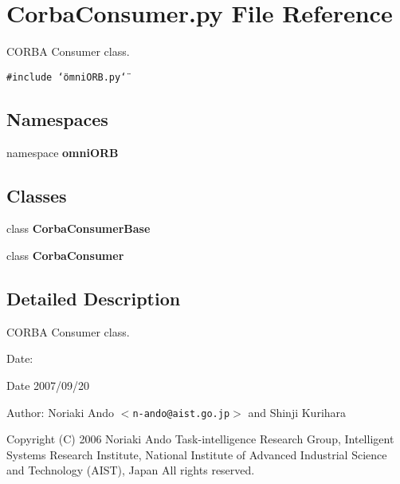 \section{Corba\-Consumer.py File Reference}
\label{CorbaConsumer_8py}
CORBA Consumer class. 

{\tt \#include \char`\"{}omni\-ORB.py\char`\"{}}\par
\subsection*{Namespaces}
\begin{CompactItemize}
\item 
namespace {\bf omni\-ORB}
\end{CompactItemize}
\subsection*{Classes}
\begin{CompactItemize}
\item 
class {\bf Corba\-Consumer\-Base}
\item 
class {\bf Corba\-Consumer}
\end{CompactItemize}


\subsection{Detailed Description}
CORBA Consumer class. 

\begin{Desc}
\item[Date:]\begin{Desc}
\item[Date]2007/09/20 \end{Desc}
\end{Desc}
\begin{Desc}
\item[Author:]Noriaki Ando $<${\tt n-ando@aist.go.jp}$>$ and Shinji Kurihara\end{Desc}
Copyright (C) 2006 Noriaki Ando Task-intelligence Research Group, Intelligent Systems Research Institute, National Institute of Advanced Industrial Science and Technology (AIST), Japan All rights reserved.